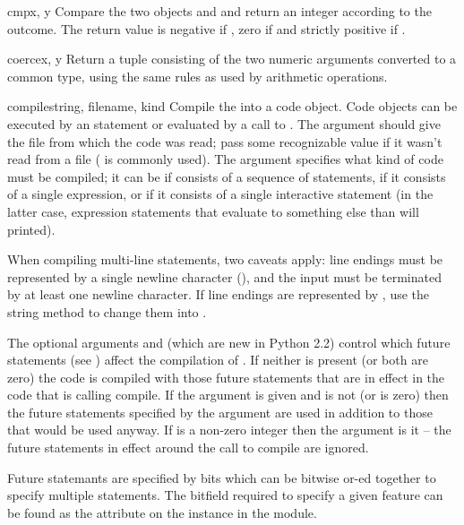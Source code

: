 \begin{funcdesc}{cmp}{x, y}
  Compare the two objects  and  and return an integer
  according to the outcome.  The return value is negative if , zero if  and strictly positive if
  .
\end{funcdesc}

\begin{funcdesc}{coerce}{x, y}
  Return a tuple consisting of the two numeric arguments converted to
  a common type, using the same rules as used by arithmetic
  operations.
\end{funcdesc}

\begin{funcdesc}{compile}{string, filename, kind}
  Compile the  into a code object.  Code objects can be
  executed by an  statement or evaluated by a call to
  .  The  argument should
  give the file from which the code was read; pass some recognizable value
  if it wasn't read from a file ( is commonly used).
  The  argument specifies what kind of code must be
  compiled; it can be  if  consists of a
  sequence of statements,  if it consists of a single
  expression, or  if it consists of a single
  interactive statement (in the latter case, expression statements
  that evaluate to something else than  will printed).

  When compiling multi-line statements, two caveats apply: line
  endings must be represented by a single newline character
  (), and the input must be terminated by at least one
  newline character.  If line endings are represented by
  , use the string  method to
  change them into .

  The optional arguments  and 
  (which are new in Python 2.2) control which future statements (see
  ) affect the compilation of .  If neither is
  present (or both are zero) the code is compiled with those future
  statements that are in effect in the code that is calling compile.
  If the  argument is given and  is not
  (or is zero) then the future statements specified by the 
  argument are used in addition to those that would be used anyway.
  If  is a non-zero integer then the 
  argument is it -- the future statements in effect around the call to
  compile are ignored.

  Future statemants are specified by bits which can be bitwise or-ed
  together to specify multiple statements.  The bitfield required to
  specify a given feature can be found as the 
  attribute on the  instance in the
   module.
\end{funcdesc}

